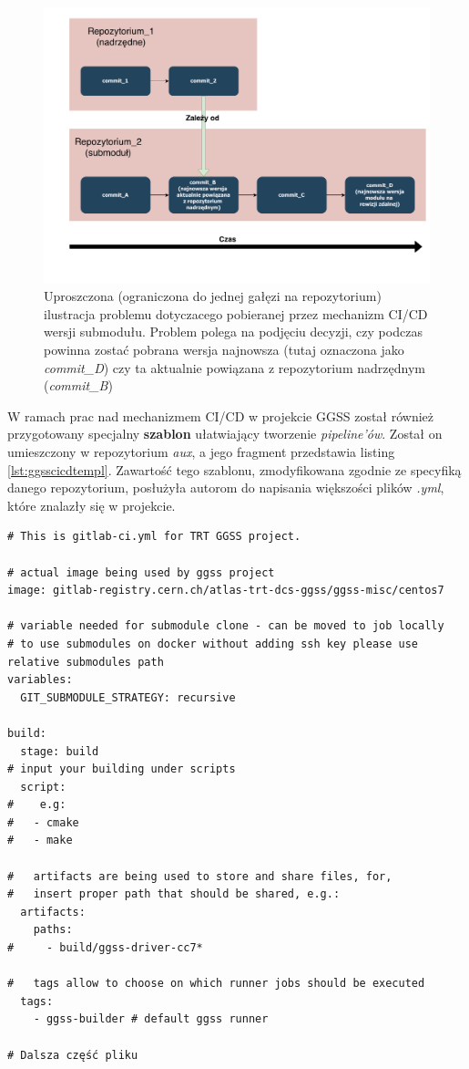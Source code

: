 \begin{figure}[H]
\centering
\caption{Uproszczona (ograniczona do jednej gałęzi na repozytorium) ilustracja problemu dotyczacego pobieranej przez mechanizm CI/CD wersji submodułu. Problem polega na podjęciu decyzji, czy podczas powinna zostać pobrana wersja najnowsza (tutaj oznaczona jako \textit{commit\_D}) czy ta aktualnie powiązana z repozytorium nadrzędnym (\textit{commit\_B})}
\label{fig:submoduleProblem}
\includegraphics[width=\textwidth]{res/SubmodulesProblem}
\end{figure}


W ramach prac nad mechanizmem CI/CD w projekcie GGSS został również przygotowany specjalny \textbf{szablon} ułatwiający tworzenie \textit{pipeline'ów}. Został on umieszczony w repozytorium \textit{aux}, a jego fragment przedstawia listing \ref{lst:ggsscicdtempl}. Zawartość tego szablonu, zmodyfikowana zgodnie ze specyfiką danego repozytorium, posłużyła autorom do napisania większości plików \textit{.yml}, które znalazły się w projekcie.

\begin{lstlisting}[caption={Fragment szablonu ułatwiającego pisanie plików \textit{.gitlab-ci.yml} znajdującego się w repozytorium \textit{aux}}, label={lst:ggsscicdtempl}]
# This is gitlab-ci.yml for TRT GGSS project.

# actual image being used by ggss project
image: gitlab-registry.cern.ch/atlas-trt-dcs-ggss/ggss-misc/centos7

# variable needed for submodule clone - can be moved to job locally
# to use submodules on docker without adding ssh key please use relative submodules path
variables:
  GIT_SUBMODULE_STRATEGY: recursive

build:
  stage: build
# input your building under scripts
  script:
#    e.g:
#   - cmake
#   - make

#   artifacts are being used to store and share files, for,
#   insert proper path that should be shared, e.g.:
  artifacts:
    paths:
#     - build/ggss-driver-cc7*

#   tags allow to choose on which runner jobs should be executed
  tags:
    - ggss-builder # default ggss runner

# Dalsza część pliku

\end{lstlisting}


